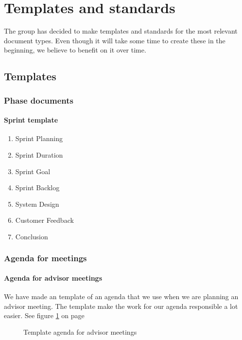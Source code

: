 

\section{Templates and standards}
The group has decided to make templates and standards for the most relevant document types. Even though it will take some time to create these in the beginning, we believe to benefit on it over time.

\subsection{Templates}

\subsubsection{Phase documents}

\paragraph{Sprint template}\hfill
\begin{enumerate}
\item{}Sprint Planning
\item{}Sprint Duration
\item{}Sprint Goal
\item{}Sprint Backlog
\item{}System Design
\item{}Customer Feedback
\item{}Conclusion
\end{enumerate}

\subsubsection{Agenda for meetings}

\paragraph{Agenda for advisor meetings}\hfill
\newline
We have made an template of an agenda that we use when we are planning an advisor meeting. The template make the work for our agenda responsible a lot easier.
See figure \ref{fig:agendaadvisor1} on page \pageref{fig:agendaadvisor}
\begin{figure}[hbt]
\begin{center}
\caption{Template agenda for advisor meetings}\label{fig:agendaadvisor1}
\end{center}
\end{figure}
\begin{figure}[hbt]
\begin{center}
\end{center}
\end{figure}

